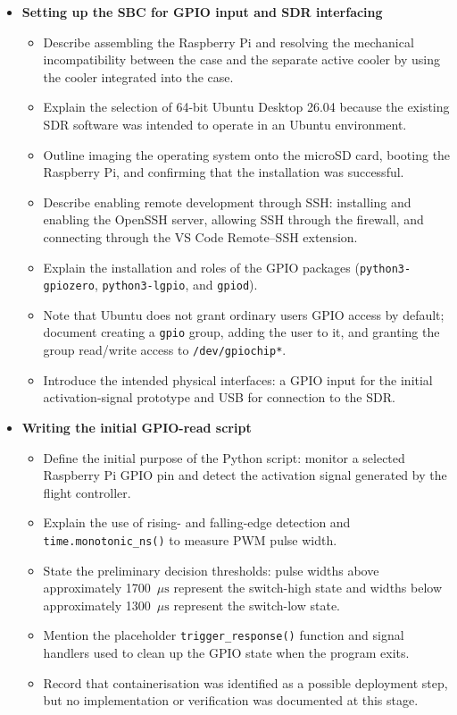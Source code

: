 \begin{itemize}
    \item \textbf{Setting up the SBC for GPIO input and SDR interfacing}
    \begin{itemize}
        \item Describe assembling the Raspberry Pi and resolving the mechanical incompatibility between the case and the separate active cooler by using the cooler integrated into the case.
        \item Explain the selection of 64-bit Ubuntu Desktop 26.04 because the existing SDR software was intended to operate in an Ubuntu environment.
        \item Outline imaging the operating system onto the microSD card, booting the Raspberry Pi, and confirming that the installation was successful.
        \item Describe enabling remote development through SSH: installing and enabling the OpenSSH server, allowing SSH through the firewall, and connecting through the VS Code Remote--SSH extension.
        \item Explain the installation and roles of the GPIO packages (\texttt{python3-gpiozero}, \texttt{python3-lgpio}, and \texttt{gpiod}).
        \item Note that Ubuntu does not grant ordinary users GPIO access by default; document creating a \texttt{gpio} group, adding the user to it, and granting the group read/write access to \texttt{/dev/gpiochip*}.
        \item Introduce the intended physical interfaces: a GPIO input for the initial activation-signal prototype and USB for connection to the SDR.
    \end{itemize}
    \item \textbf{Writing the initial GPIO-read script}
    \begin{itemize}
        \item Define the initial purpose of the Python script: monitor a selected Raspberry Pi GPIO pin and detect the activation signal generated by the flight controller.
        \item Explain the use of rising- and falling-edge detection and \texttt{time.monotonic\_ns()} to measure PWM pulse width.
        \item State the preliminary decision thresholds: pulse widths above approximately 1700~$\mu\mathrm{s}$ represent the switch-high state and widths below approximately 1300~$\mu\mathrm{s}$ represent the switch-low state.
        \item Mention the placeholder \texttt{trigger\_response()} function and signal handlers used to clean up the GPIO state when the program exits.
        \item Record that containerisation was identified as a possible deployment step, but no implementation or verification was documented at this stage.
    \end{itemize}
\end{itemize}

